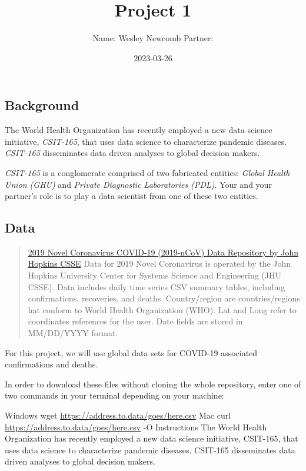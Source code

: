 \documentclass[
]{article}
\title{Project 1}
\author{Name: Wesley Newcomb Partner:}
\date{2023-03-26}
\begin{document}
\maketitle

\hypertarget{background}{%
\subsection{Background}\label{background}}

The World Health Organization has recently employed a new data science
initiative, \emph{CSIT-165}, that uses data science to characterize
pandemic diseases. \emph{CSIT-165} disseminates data driven analyses to
global decision makers.

\emph{CSIT-165} is a conglomerate comprised of two fabricated entities:
\emph{Global Health Union (GHU)} and \emph{Private Diagnostic
Laboratories (PDL)}. Your and your partner's role is to play a data
scientist from one of these two entities.

\hypertarget{data}{%
\subsection{Data}\label{data}}

\begin{quote}
\href{https://github.com/CSSEGISandData/COVID-19/tree/master/csse_covid_19_data/csse_covid_19_time_series}{2019
Novel Coronavirus COVID-19 (2019-nCoV) Data Repository by John Hopkins
CSSE} Data for 2019 Novel Coronavirus is operated by the John Hopkins
University Center for Systems Science and Engineering (JHU CSSE). Data
includes daily time series CSV summary tables, including confirmations,
recoveries, and deaths. Country/region are countries/regions hat conform
to World Health Organization (WHO). Lat and Long refer to coordinates
references for the user. Date fields are stored in MM/DD/YYYY format.
\end{quote}

For this project, we will use global data sets for COVID-19 associated
confirmations and deaths.

In order to download these files without cloning the whole repository,
enter one of two commands in your terminal depending on your machine:

Windows wget \url{https://address.to.data/goes/here.csv} Mac curl
\url{https://address.to.data/goes/here.csv} -O Instructions The World
Health Organization has recently employed a new data science initiative,
CSIT-165, that uses data science to characterize pandemic diseases.
CSIT-165 disseminates data driven analyses to global decision makers.
\end{document}
